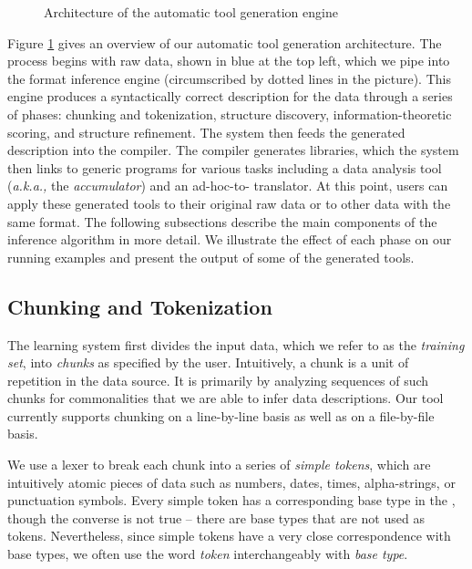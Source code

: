 
\begin{figure}
\begin{center}
\caption{Architecture of the automatic tool generation engine} \shrink
\label{fig-archi}
\end{center}
\end{figure}

Figure \ref{fig-archi} gives an overview of our automatic
tool generation architecture. The process 
begins with raw data, shown in blue at the top left, which we pipe
into the format inference engine
(circumscribed by dotted lines in the picture).  
This engine produces a syntactically correct \pads{}
description for the data
through a series of phases:
chunking and tokenization, structure discovery, information-theoretic
scoring, and structure refinement.
The system then feeds the generated \pads{} description into the
\pads{} compiler.  The compiler generates libraries, which the system
then links to generic programs for various tasks including a data
analysis tool ({\em a.k.a.,} the {\em accumulator}) and an
ad-hoc-to-\xml{} translator.  At this point, users can apply these
generated tools to their original raw data or to other data with the
same format.
The following subsections describe the main components of the
inference algorithm in more detail.  We 
illustrate the effect of each phase on our running examples and
present the output of some of the generated tools.

\subsection{Chunking and Tokenization}
The learning system first divides the input data, which we refer
to as the {\em training set}, into {\em chunks} as specified by the
user. Intuitively, a chunk is a unit of repetition in the data source.
It is primarily by analyzing sequences of such chunks for commonalities
that we are able to infer data descriptions.  Our tool currently supports
chunking on a line-by-line basis as well as on a file-by-file basis.  

We use a lexer to break each chunk into a series of {\em simple
tokens}, which are intuitively atomic pieces of data such as
numbers, dates, times, alpha-strings, or punctuation symbols.
Every simple token has a corresponding
base type in the \ir{}, though the converse is not true -- there are 
base types that are not used as tokens.  Nevertheless, since
simple tokens have a very close correspondence with base types,
we often use the word {\em token} interchangeably with {\em base type}.
  

